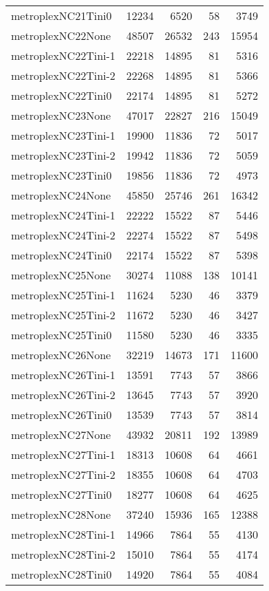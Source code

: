 \begin{longtable}{lrrrr}
metroplexNC21Tini0 & 12234 & 6520 & 58 & 3749 \\
metroplexNC22None & 48507 & 26532 & 243 & 15954 \\
metroplexNC22Tini-1 & 22218 & 14895 & 81 & 5316 \\
metroplexNC22Tini-2 & 22268 & 14895 & 81 & 5366 \\
metroplexNC22Tini0 & 22174 & 14895 & 81 & 5272 \\
metroplexNC23None & 47017 & 22827 & 216 & 15049 \\
metroplexNC23Tini-1 & 19900 & 11836 & 72 & 5017 \\
metroplexNC23Tini-2 & 19942 & 11836 & 72 & 5059 \\
metroplexNC23Tini0 & 19856 & 11836 & 72 & 4973 \\
metroplexNC24None & 45850 & 25746 & 261 & 16342 \\
metroplexNC24Tini-1 & 22222 & 15522 & 87 & 5446 \\
metroplexNC24Tini-2 & 22274 & 15522 & 87 & 5498 \\
metroplexNC24Tini0 & 22174 & 15522 & 87 & 5398 \\
metroplexNC25None & 30274 & 11088 & 138 & 10141 \\
metroplexNC25Tini-1 & 11624 & 5230 & 46 & 3379 \\
metroplexNC25Tini-2 & 11672 & 5230 & 46 & 3427 \\
metroplexNC25Tini0 & 11580 & 5230 & 46 & 3335 \\
metroplexNC26None & 32219 & 14673 & 171 & 11600 \\
metroplexNC26Tini-1 & 13591 & 7743 & 57 & 3866 \\
metroplexNC26Tini-2 & 13645 & 7743 & 57 & 3920 \\
metroplexNC26Tini0 & 13539 & 7743 & 57 & 3814 \\
metroplexNC27None & 43932 & 20811 & 192 & 13989 \\
metroplexNC27Tini-1 & 18313 & 10608 & 64 & 4661 \\
metroplexNC27Tini-2 & 18355 & 10608 & 64 & 4703 \\
metroplexNC27Tini0 & 18277 & 10608 & 64 & 4625 \\
metroplexNC28None & 37240 & 15936 & 165 & 12388 \\
metroplexNC28Tini-1 & 14966 & 7864 & 55 & 4130 \\
metroplexNC28Tini-2 & 15010 & 7864 & 55 & 4174 \\
metroplexNC28Tini0 & 14920 & 7864 & 55 & 4084 \\

\end{longtable}
